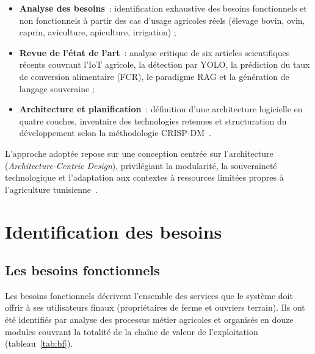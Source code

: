 \begin{itemize}
    \item \textbf{Analyse des besoins}~: identification exhaustive des besoins fonctionnels
          et non fonctionnels à partir des cas d'usage agricoles réels (élevage bovin,
          ovin, caprin, aviculture, apiculture, irrigation) ;
    \item \textbf{Revue de l'état de l'art}~: analyse critique de six articles scientifiques
          récents couvrant l'IoT agricole, la détection par YOLO, la prédiction du taux
          de conversion alimentaire (FCR), le paradigme RAG et la génération de
          langage souveraine ;
    \item \textbf{Architecture et planification}~: définition d'une architecture logicielle
          en quatre couches, inventaire des technologies retenues et structuration du
          développement selon la méthodologie CRISP-DM~\cite{wirth2000}.
\end{itemize}

L'approche adoptée repose sur une conception centrée sur l'architecture
(\textit{Architecture-Centric Design}), privilégiant la modularité, la souveraineté
technologique et l'adaptation aux contextes à ressources limitées propres à
l'agriculture tunisienne~\cite{utap2023}.

\section{Identification des besoins}

\subsection{Les besoins fonctionnels}

Les besoins fonctionnels décrivent l'ensemble des services que le système doit offrir
à ses utilisateurs finaux (propriétaires de ferme et ouvriers terrain).
Ils ont été identifiés par analyse des processus métier agricoles et organisés
en douze modules couvrant la totalité de la chaîne de valeur de l'exploitation
(tableau~\ref{tab:bf}).


